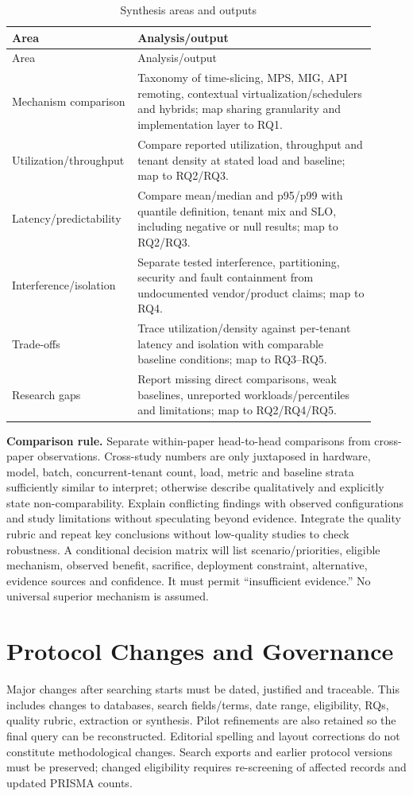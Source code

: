 \documentclass[12pt,a4paper]{article}
\begin{document}
\begin{longtable}{p{0.27\linewidth}p{0.64\linewidth}}
\caption{Synthesis areas and outputs}\label{tab:synthesis}\\\toprule Area & Analysis/output\\\midrule\endfirsthead
\toprule Area & Analysis/output\\\midrule\endhead
Mechanism comparison & Taxonomy of time-slicing, MPS, MIG, API remoting, contextual virtualization/schedulers and hybrids; map sharing granularity and implementation layer to RQ1.\\
Utilization/throughput & Compare reported utilization, throughput and tenant density at stated load and baseline; map to RQ2/RQ3.\\
Latency/predictability & Compare mean/median and p95/p99 with quantile definition, tenant mix and SLO, including negative or null results; map to RQ2/RQ3.\\
Interference/isolation & Separate tested interference, partitioning, security and fault containment from undocumented vendor/product claims; map to RQ4.\\
Trade-offs & Trace utilization/density against per-tenant latency and isolation with comparable baseline conditions; map to RQ3--RQ5.\\
Research gaps & Report missing direct comparisons, weak baselines, unreported workloads/percentiles and limitations; map to RQ2/RQ4/RQ5.\\\bottomrule
\end{longtable}

\textbf{Comparison rule.} Separate within-paper head-to-head comparisons from cross-paper observations. Cross-study numbers are only juxtaposed in hardware, model, batch, concurrent-tenant count, load, metric and baseline strata sufficiently similar to interpret; otherwise describe qualitatively and explicitly state non-comparability. Explain conflicting findings with observed configurations and study limitations without speculating beyond evidence. Integrate the quality rubric and repeat key conclusions without low-quality studies to check robustness. A conditional decision matrix will list scenario/priorities, eligible mechanism, observed benefit, sacrifice, deployment constraint, alternative, evidence sources and confidence. It must permit ``insufficient evidence.'' No universal superior mechanism is assumed.

\section{Protocol Changes and Governance}\label{sec:changes}
Major changes after searching starts must be dated, justified and traceable. This includes changes to databases, search fields/terms, date range, eligibility, RQs, quality rubric, extraction or synthesis. Pilot refinements are also retained so the final query can be reconstructed. Editorial spelling and layout corrections do not constitute methodological changes. Search exports and earlier protocol versions must be preserved; changed eligibility requires re-screening of affected records and updated PRISMA counts.
\end{document}
